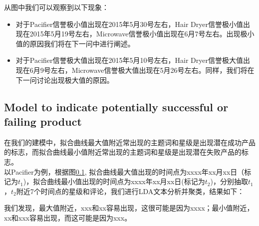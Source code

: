 \documentclass{mcmthesis}
\begin{document}
从图中我们可以观察到以下现象：
\begin{itemize}
	\item 对于Pacifier信誉极小值出现在2015年5月30号左右，Hair Dryer信誉极小值出现在2015年5月19号左右，Microwave信誉极小值出现在6月7号左右。出现极小值的原因我们将在下一问中进行阐述。
	\item 对于Pacifier信誉极大值出现在2015年5月10号左右，Hair Dryer信誉极大值出现在6月9号左右，Microwave信誉极大值出现在5月26号左右。同样，我们将在下一问讨论出现极大值的原因。
\end{itemize}

\subsection{Model to indicate potentially successful or failing product}
在我们的建模中，拟合曲线最大值附近常出现的主题词和星级是出现潜在成功产品的标志，而拟合曲线最小值附近常出现的主题词和星级是出现潜在失败产品的标志。\\

以Pacifier为例，根据图\ref{}, 拟合曲线最大值出现的时间点为xxxx年xx月xx日（标记为$t_{1}$)，拟合曲线最小值出现的时间点为xxxx年xx月xx日(标记为$t_{2}$)，分别抽取$t_{1}$，$t_{2}$附近7个时间点的星级和评论，我们进行LDA文本分析并聚类，结果如下：

我们发现，最大值附近，xxx和xx容易出现，这很可能是因为xxxx；最小值附近，xx和xxx容易出现，而这可能是因为xxx。
\end{document}
